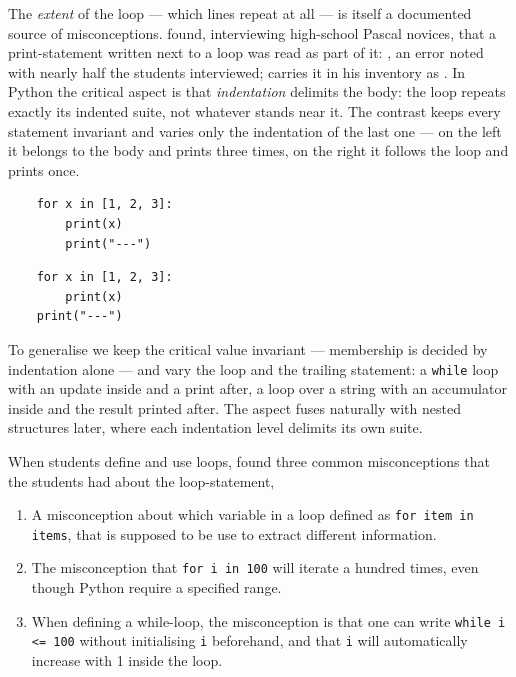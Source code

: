The \emph{extent} of the loop --- which lines repeat at all --- is itself a
documented source of misconceptions.
\textcite{Sleeman1984} found, interviewing high-school Pascal novices, that
a print-statement written next to a loop was read as part of it:
, an error noted with nearly half the students interviewed;
\textcite{Sorva2012Dissertation} carries it in his inventory as
.
In Python the critical aspect is that \emph{indentation} delimits the body:
the loop repeats exactly its indented suite, not whatever stands near it.
The contrast keeps every statement invariant and varies only the indentation
of the last one --- on the left it belongs to the body and prints three
times, on the right it follows the loop and prints once.

\hfill
\begin{minipage}[t]{0.45\columnwidth}
  \begin{verbatim}
    for x in [1, 2, 3]:
        print(x)
        print("---")
  \end{verbatim}
\end{minipage}
\hfill
\begin{minipage}[t]{0.45\columnwidth}
  \begin{verbatim}
    for x in [1, 2, 3]:
        print(x)
    print("---")
  \end{verbatim}
\end{minipage}

To generalise we keep the critical value invariant --- membership is decided
by indentation alone --- and vary the loop and the trailing statement: a
\texttt{while} loop with an update inside and a print after, a
loop over a string with an accumulator inside and the result printed after.
The aspect fuses naturally with nested structures later, where each
indentation level delimits its own suite.

When students define and use loops, \textcite{GuoMarkelZhang2020} found
three common misconceptions that the students had about the loop-statement,

\begin{enumerate}
    \item A misconception about which variable in a loop defined as 
      \texttt{for item in items}, that is supposed to be use to 
      extract different information.
    \item The misconception that \texttt{for i in 100} will iterate 
      a hundred times, even though Python require a specified range.
    \item When defining a while-loop, the misconception is that one can write
      \texttt{while i <= 100} without initialising
      \texttt{i} beforehand, and that \texttt{i} will
      automatically increase with 1 inside the loop.
\end{enumerate}

